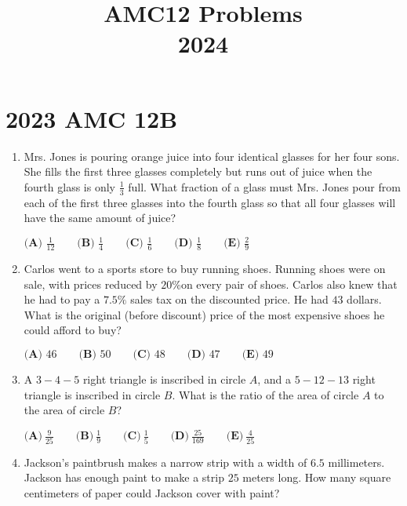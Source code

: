 \documentclass{article}
\title{AMC12 Problems \\ 2024}
\date{}
\begin{document}
\maketitle\thispagestyle{fancy}\newpage\section*{2023 AMC 12B}\begin{enumerate}[label=\arabic*., itemsep=0.5em]\item Mrs. Jones is pouring orange juice into four identical glasses for her four sons. She fills the first three glasses completely but runs out of juice when the fourth glass is only \(\frac{1}{3}\) full. What fraction of a glass must Mrs. Jones pour from each of the first three glasses into the fourth glass so that all four glasses will have the same amount of juice?

\(\textbf{(A) }\frac{1}{12}\qquad\textbf{(B) }\frac{1}{4}\qquad\textbf{(C) }\frac{1}{6}\qquad\textbf{(D) }\frac{1}{8}\qquad\textbf{(E) }\frac{2}{9}\)\par \vspace{0.5em}\item Carlos went to a sports store to buy running shoes. Running shoes were on sale, with prices reduced by \(20\%\)on every pair of shoes. Carlos also knew that he had to pay a \(7.5\%\) sales tax on the discounted price. He had \(43\) dollars. What is the original (before discount) price of the most expensive shoes he could afford to buy?

\(\textbf{(A) }46\qquad\textbf{(B) }50\qquad\textbf{(C) }48\qquad\textbf{(D) }47\qquad\textbf{(E) }49\)\par \vspace{0.5em}\item A \(3-4-5\) right triangle is inscribed in circle \(A\), and a \(5-12-13\) right triangle is inscribed in circle \(B\). What is the ratio of the area of circle \(A\) to the area of circle \(B\)?

\(\textbf{(A)}~\frac{9}{25}\qquad\textbf{(B)}~\frac{1}{9}\qquad\textbf{(C)}~\frac{1}{5}\qquad\textbf{(D)}~\frac{25}{169}\qquad\textbf{(E)}~\frac{4}{25}\)\par \vspace{0.5em}\item Jackson's paintbrush makes a narrow strip with a width of \(6.5\) millimeters. Jackson has enough paint to make a strip \(25\) meters long. How many square centimeters of paper could Jackson cover with paint?


\end{enumerate}
\end{document}

